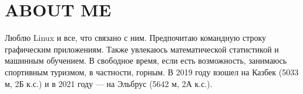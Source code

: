 \section{ABOUT ME}

    Люблю Linux и все, что связано с ним. Предпочитаю командную строку графическим приложениям.
    Также увлекаюсь математической статистикой и машинным обучением.
    В свободное время, если есть возможность, занимаюсь спортивным туризмом, в частности, горным. В 2019 году
    взошел на Казбек (5033 м, 2Б к.с.) и в 2021 году — на Эльбрус (5642 м, 2А к.с.).
